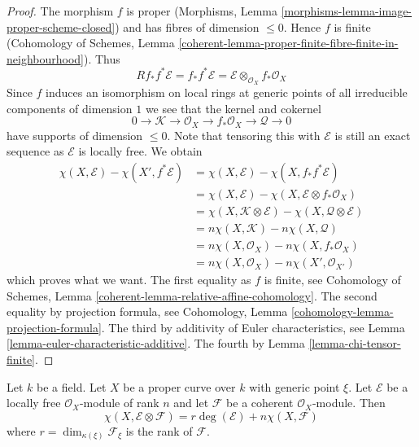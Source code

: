 \begin{proof}
The morphism $f$ is proper
(Morphisms, Lemma \ref{morphisms-lemma-image-proper-scheme-closed})
and has fibres of dimension $\leq 0$. Hence $f$ is finite
(Cohomology of Schemes, Lemma
\ref{coherent-lemma-proper-finite-fibre-finite-in-neighbourhood}).
Thus
$$
Rf_*f^*\mathcal{E} = f_*f^*\mathcal{E} =
\mathcal{E} \otimes_{\mathcal{O}_X} f_*\mathcal{O}_X
$$
Since $f$ induces an isomorphism on local rings at generic points of
all irreducible components of dimension $1$ we see that the kernel
and cokernel
$$
0 \to \mathcal{K} \to \mathcal{O}_X \to f_*\mathcal{O}_X \to \mathcal{Q} \to 0
$$
have supports of dimension $\leq 0$. Note that tensoring this with
$\mathcal{E}$ is still an exact sequence as $\mathcal{E}$ is locally free.
We obtain
\begin{align*}
\chi(X, \mathcal{E}) - \chi(X', f^*\mathcal{E})
& =
\chi(X, \mathcal{E}) - \chi(X, f_*f^*\mathcal{E}) \\
& =
\chi(X, \mathcal{E}) - \chi(X, \mathcal{E} \otimes f_*\mathcal{O}_X) \\
& =
\chi(X, \mathcal{K} \otimes \mathcal{E}) -
\chi(X, \mathcal{Q} \otimes \mathcal{E}) \\
& =
n\chi(X, \mathcal{K}) -
n\chi(X, \mathcal{Q}) \\
& =
n\chi(X, \mathcal{O}_X) - n\chi(X, f_*\mathcal{O}_X) \\
& =
n\chi(X, \mathcal{O}_X) - n\chi(X', \mathcal{O}_{X'})
\end{align*}
which proves what we want. The first equality as $f$ is finite, see
Cohomology of Schemes, Lemma \ref{coherent-lemma-relative-affine-cohomology}.
The second equality by projection formula, see
Cohomology, Lemma \ref{cohomology-lemma-projection-formula}.
The third by additivity of Euler characteristics, see
Lemma \ref{lemma-euler-characteristic-additive}.
The fourth by Lemma \ref{lemma-chi-tensor-finite}.
\end{proof}

\begin{lemma}
\label{lemma-degree-on-proper-curve}
Let $k$ be a field. Let $X$ be a proper curve over $k$ with generic point
$\xi$. Let $\mathcal{E}$ be a locally free $\mathcal{O}_X$-module of rank $n$
and let $\mathcal{F}$ be a coherent $\mathcal{O}_X$-module. Then
$$
\chi(X, \mathcal{E} \otimes \mathcal{F}) =
r \deg(\mathcal{E}) + n \chi(X, \mathcal{F})
$$
where $r = \dim_{\kappa(\xi)} \mathcal{F}_\xi$ is the rank of $\mathcal{F}$.
\end{lemma}

